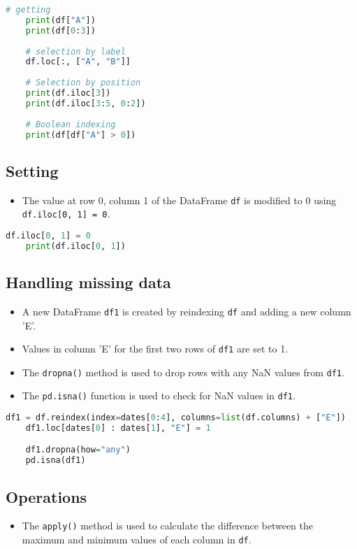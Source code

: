 \begin{lstlisting}[language=Python]
	# getting
	print(df["A"])
	print(df[0:3])
	
	# selection by label
	df.loc[:, ["A", "B"]]
	
	# Selection by position
	print(df.iloc[3])
	print(df.iloc[3:5, 0:2])
	
	# Boolean indexing
	print(df[df["A"] > 0])
\end{lstlisting}



\subsection{Setting}
\begin{itemize}
	\item The value at row 0, column 1 of the DataFrame \texttt{df} is modified to 0 using \texttt{df.iloc[0, 1] = 0}.
\end{itemize}

\begin{lstlisting}[language=Python]
	df.iloc[0, 1] = 0
	print(df.iloc[0, 1])
\end{lstlisting}


\subsection{Handling missing data}
\begin{itemize}
	\item A new DataFrame \texttt{df1} is created by reindexing \texttt{df} and adding a new column 'E'.
	\item Values in column 'E' for the first two rows of \texttt{df1} are set to 1.
	\item The \texttt{dropna()} method is used to drop rows with any NaN values from \texttt{df1}.
	\item The \texttt{pd.isna()} function is used to check for NaN values in \texttt{df1}.
\end{itemize}


\begin{lstlisting}[language=Python]
	df1 = df.reindex(index=dates[0:4], columns=list(df.columns) + ["E"])
	df1.loc[dates[0] : dates[1], "E"] = 1

	df1.dropna(how="any")
	pd.isna(df1)
\end{lstlisting}


\subsection{Operations}
\begin{itemize}
	\item The \texttt{apply()} method is used to calculate the difference between the maximum and minimum values of each column in \texttt{df}.
\end{itemize}


